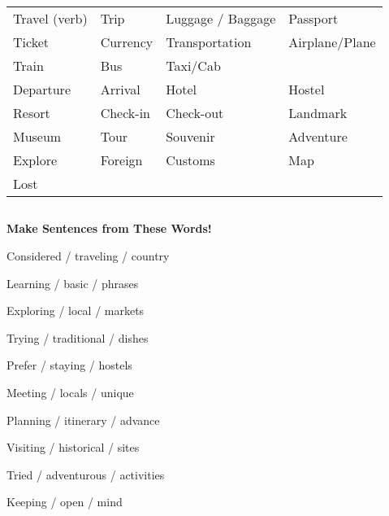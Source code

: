 \documentclass[]{article} %
\begin{document}
	\begin{minipage}[h]{0.7\textwidth}
		\begin{center}
			
			\begin{tabular}{ p{3.5cm} p{3.5cm} p{3.5cm} p{3.5cm}}
				
				
				
				Travel (verb)
				& Trip
				& Luggage / Baggage
				& Passport
				\vfil	\\ Ticket
				& Currency
				& Transportation
				
				
				& Airplane/Plane
				\\ Train
				& Bus
				& Taxi/Cab
				\vfil	\\ Departure
				& Arrival
				
				
				& Hotel
				& Hostel
				\\ Resort
				& Check-in
				& Check-out
				
				
				& Landmark
				\\ Museum
				& Tour
				& Souvenir
				
				& Adventure
				\\ Explore
				& Foreign
				& Customs
				& Map
				\vfil	\\ Lost
				
				
			\end{tabular}
			
		\end{center}
		
	\end{minipage}
	
	\subsection*{}
	\begin{question}
		\textbf{Make Sentences from These Words!}
	\end{question}
	
	Considered / traveling / country \par
	Learning / basic / phrases \par
	Exploring / local / markets \par
	Trying / traditional / dishes \par
	Prefer / staying / hostels \par
	Meeting / locals / unique \par
	Planning / itinerary / advance \par
	Visiting / historical / sites \par
	Tried / adventurous / activities \par
	Keeping / open / mind \par
	
\end{document}
